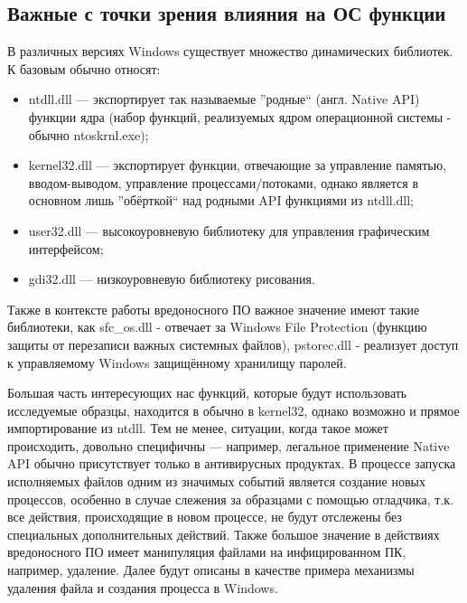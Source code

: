 \subsection {Важные с точки зрения влияния на ОС функции}
В различных версиях Windows существует множество динамических библиотек. К базовым обычно относят:
\begin {itemize}
	\item ntdll.dll --- экспортирует так называемые ''родные`` (англ. Native API) функции ядра (набор функций, реализуемых ядром операционной системы - обычно ntoskrnl.exe);
	\item kernel32.dll --- экспортирует функции, отвечающие за управление памятью, вводом-выводом, управление процессами/потоками, однако является в основном лишь ''обёрткой`` над родными API функциями из ntdll.dll;
	\item user32.dll --- высокоуровневую библиотеку для управления графическим интерфейсом;
	\item gdi32.dll --- низкоуровневую библиотеку рисования.
\end {itemize}
Также в контексте работы вредоносного ПО важное значение имеют такие библиотеки, как sfc\_os.dll - отвечает за Windows File Protection (функцию защиты от перезаписи важных системных файлов), pstorec.dll - реализует доступ к управляемому Windows защищённому хранилищу паролей.

Большая часть интересующих нас функций, которые будут использовать исследуемые образцы, находится в обычно в kernel32, однако возможно и прямое импортирование  из ntdll. Тем не менее, ситуации, когда такое может происходить, довольно специфичны --- например, легальное применение Native API обычно присутствует только в антивирусных продуктах.
В процессе запуска исполняемых файлов одним из значимых событий является создание новых процессов, особенно в случае слежения за образцами с помощью отладчика, т.к. все действия, происходящие в новом процессе, не будут отслежены без специальных дополнительных действий. Также большое значение в действиях вредоносного ПО имеет манипуляция файлами на инфицированном ПК, например, удаление. Далее будут описаны в качестве примера механизмы удаления файла и создания процесса в Windows.


